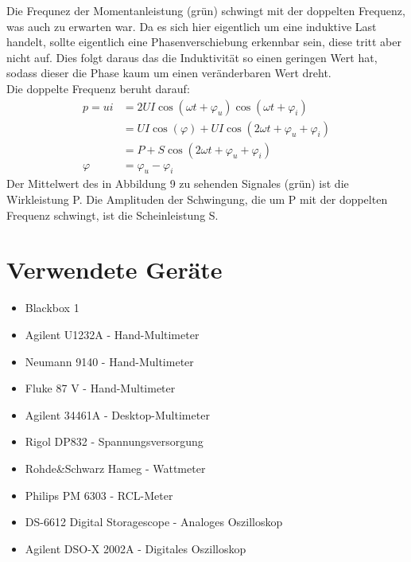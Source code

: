 \documentclass[a4paper,12pt]{article}
\begin{document}
	Die Frequnez der Momentanleistung (grün) schwingt mit der doppelten Frequenz, was auch zu erwarten war. Da es sich hier eigentlich um eine induktive Last handelt, sollte eigentlich eine Phasenverschiebung erkennbar sein, diese tritt aber nicht auf. Dies folgt daraus das die Induktivität so einen geringen Wert hat, sodass dieser die Phase kaum um einen veränderbaren Wert dreht.\\
	Die doppelte Frequenz beruht darauf:
	\begin{align*}
		p = ui &= 2UI\cos(\omega t + \varphi_u)\cos(\omega t + \varphi_i) \\
			   &= UI\cos(\varphi) + UI\cos(2\omega t + \varphi_u + \varphi_i) \\
			   &= P + S\cos(2\omega t + \varphi_u + \varphi_i) \\
		\varphi &= \varphi_u - \varphi_i
	\end{align*}
	Der Mittelwert des in Abbildung 9 zu sehenden Signales (grün) ist die Wirkleistung P. Die Amplituden der Schwingung, die um P mit der doppelten Frequenz schwingt, ist die Scheinleistung S.
	\section{Verwendete Geräte}
	\begin{itemize}
		\item Blackbox 1
		\item Agilent U1232A - Hand-Multimeter
		\item Neumann 9140 - Hand-Multimeter
		\item Fluke 87 V - Hand-Multimeter
		\item Agilent 34461A - Desktop-Multimeter
		\item Rigol DP832 - Spannungsversorgung
		\item Rohde\&Schwarz Hameg - Wattmeter
		\item Philips PM 6303 - RCL-Meter
		\item DS-6612 Digital Storagescope - Analoges Oszilloskop
		\item Agilent DSO-X 2002A - Digitales Oszilloskop
	\end{itemize}
	\newpage
	\listoffigures
	\newpage
	\newpage
	\listoftables
	\newpage
\end{document}
